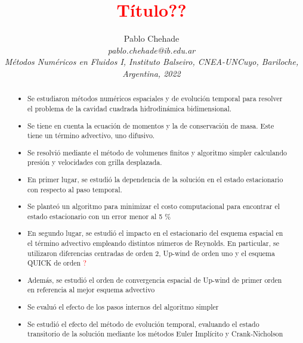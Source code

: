 \documentclass[aps,prb,twocolumn,superscriptaddress,floatfix,longbibliography,10pt]{revtex4-2}
\newcounter{para}
\begin{document}
\newcommand{\mytitle}{\textcolor{red}{Título??}}

\title{\mytitle}

\author{Pablo Chehade \\
    \small \textit{pablo.chehade@ib.edu.ar} \\
    \small \textit{Métodos Numéricos en Fluidos I, Instituto Balseiro, CNEA-UNCuyo, Bariloche, Argentina, 2022} \\}


\begin{abstract}

\begin{itemize}
  \item Se estudiaron métodos numéricos espaciales y de evolución temporal para resolver el problema de la cavidad cuadrada hidrodinámica bidimensional.
  \item Se tiene en cuenta la ecuación de momentos y la de conservación de masa. Este tiene un término advectivo, uno difusivo.
  \item Se resolvió mediante el método de volumenes finitos y algoritmo simpler calculando presión y velocidades con grilla desplazada.
  \item En primer lugar, se estudió la dependencia de la solución en el estado estacionario con respecto al paso temporal.
  \item Se planteó un algoritmo para minimizar el costo computacional para encontrar el estado estacionario con un error menor al 5 \%
  \item En segundo lugar, se estudió el impacto en el estacionario del esquema espacial en el término advectivo empleando distintos números de Reynolds. En particular, se utilizaron diferencias centradas de orden 2, Up-wind de orden uno y el esquema QUICK de orden \textcolor{red}{?}
  \item Además, se estudió el orden de convergencia espacial de Up-wind de primer orden en referencia al mejor esquema advectivo
  \item Se evaluó el efecto de los pasos internos del algoritmo simpler
  \item Se estudió el efecto del método de evolución temporal, evaluando el estado transitorio de la solución mediante los métodos Euler Implícito y Crank-Nicholson
\end{itemize}


\end{abstract}

\maketitle
\end{document}
